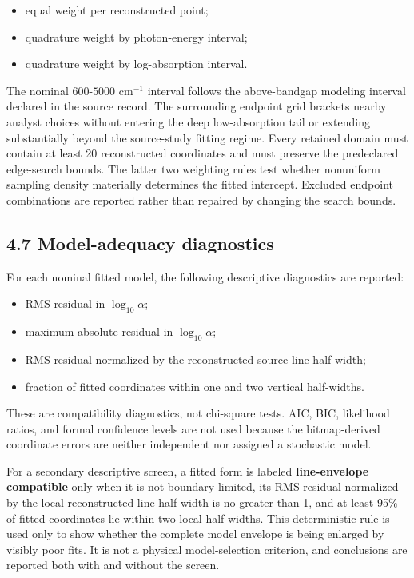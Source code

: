 \begin{itemize}
\tightlist
\item
  equal weight per reconstructed point;
\item
  quadrature weight by photon-energy interval;
\item
  quadrature weight by log-absorption interval.
\end{itemize}

The nominal \(600\)-\(5000\) cm\(^{-1}\) interval follows the
above-bandgap modeling interval declared in the source record. The
surrounding endpoint grid brackets nearby analyst choices without
entering the deep low-absorption tail or extending substantially beyond
the source-study fitting regime. Every retained domain must contain at
least 20 reconstructed coordinates and must preserve the predeclared
edge-search bounds. The latter two weighting rules test whether
nonuniform sampling density materially determines the fitted intercept.
Excluded endpoint combinations are reported rather than repaired by
changing the search bounds.

\subsection{4.7 Model-adequacy
diagnostics}\label{model-adequacy-diagnostics}

For each nominal fitted model, the following descriptive diagnostics are
reported:

\begin{itemize}
\tightlist
\item
  RMS residual in \(\log_{10}\alpha\);
\item
  maximum absolute residual in \(\log_{10}\alpha\);
\item
  RMS residual normalized by the reconstructed source-line half-width;
\item
  fraction of fitted coordinates within one and two vertical
  half-widths.
\end{itemize}

These are compatibility diagnostics, not chi-square tests. AIC, BIC,
likelihood ratios, and formal confidence levels are not used because the
bitmap-derived coordinate errors are neither independent nor assigned a
stochastic model.

For a secondary descriptive screen, a fitted form is labeled
\textbf{line-envelope compatible} only when it is not boundary-limited,
its RMS residual normalized by the local reconstructed line half-width
is no greater than 1, and at least 95\% of fitted coordinates lie within
two local half-widths. This deterministic rule is used only to show
whether the complete model envelope is being enlarged by visibly poor
fits. It is not a physical model-selection criterion, and conclusions
are reported both with and without the screen.

